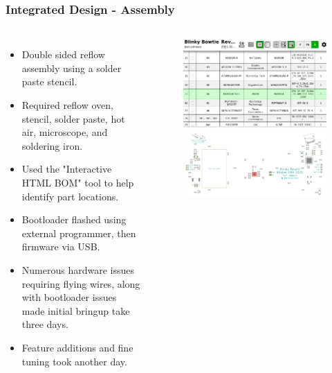 \documentclass[aspectratio=169, t]{beamer}
\begin{document}
\begin{frame}
\frametitle{Integrated Design - Assembly}
\vspace{-5mm}
\begin{columns}
	\begin{itemize}
		\item Double sided reflow assembly using a solder paste stencil.
		\item Required reflow oven, stencil, solder paste, hot air, microscope, and soldering iron.
		\item Used the "Interactive HTML BOM" tool to help identify part locations.
		\item Bootloader flashed using external programmer, then firmware via USB.
		\item Numerous hardware issues requiring flying wires, along with bootloader issues made initial bringup take three days.
		\item Feature additions and fine tuning took another day.
	\end{itemize}
	\begin{figure}
		\includegraphics[width=0.85\linewidth]{images/ibom.png}
	\end{figure}
\end{columns}
\end{frame}
\end{document}
